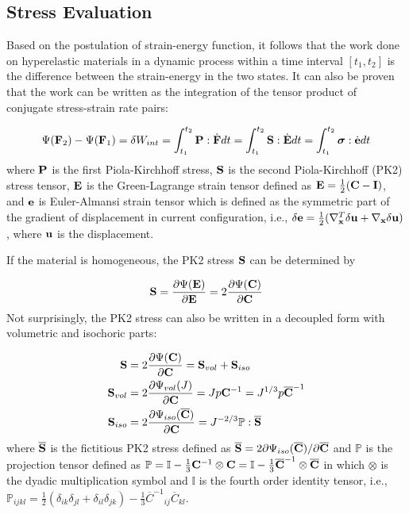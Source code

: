 %
\subsection{Stress Evaluation} \label{general_stress}
Based on the postulation of strain-energy function, it follows that the work done on hyperelastic materials in a dynamic process within a time interval $[t_1, t_2]$ is the difference between the strain-energy in the two states. It can also be proven that the work can be written as the integration of the tensor product of conjugate stress-strain rate pairs:

\begin{equation}
\Psi(\bold{F}_2) - \Psi(\bold{F}_1) = \delta{W_{int}} = \int_{t_1}^{t_2}\bold{P}:\dot{\bold{F}}dt = \int_{t_1}^{t_2}\bold{S}:\dot{\bold{E}}dt = 
\int_{t_1}^{t_2}\boldsymbol{\sigma}:\dot{\bold{e}}dt
\end{equation}
where $\bold{P}$ is the first Piola-Kirchhoff stress, $\bold{S}$ is the second Piola-Kirchhoff (PK2) stress tensor, $\bold{E}$ is the Green-Lagrange strain tensor defined as $\bold{E} = \frac{1}{2}(\bold{C} - \bold{I})$, and $\bold{e}$ is Euler-Almansi strain tensor which is defined as the symmetric part of the gradient of displacement in current configuration, i.e., $\delta\bold{e} = \frac{1}{2}( \nabla_{\bold{x}}^T\delta\bold{u} + \nabla_{\bold{x}}\delta\bold{u} )$, where $\bold{u}$ is the displacement.

If the material is homogeneous, the PK2 stress $\bold{S}$ can be determined by 

\begin{equation}
\bold{S}  = \frac{\partial\Psi(\bold{E})}{\partial{\bold{E}}} = 2\frac{\partial\Psi(\bold{C})}{\partial{\bold{C}}}\end{equation}
Not surprisingly, the PK2 stress can also be written in a decoupled form with volumetric and isochoric parts:

\begin{subequations}
\label{S}
\begin{align}
\bold{S} &=  2\frac{\partial{\Psi({\bold{C})}}}{\partial{\bold{C}}} = \bold{S}_{vol}  + \bold{S}_{iso} 
\label {Stotal} \\
\bold{S}_{vol} &= 2\frac{\partial{\Psi_{vol}(J)}}{\partial{\bold{C}}} = Jp{\bold{C}} ^{-1} \label{Svol} = J^{1/3}p{\overline{\bold{C}}}^{-1}\\
\bold{S}_{iso}  &= 2\frac{\partial{\Psi_{iso}({\overline{\bold{C}})}}}{\partial{\bold{C}}} = J^{-2/3}\mathbb{P}:\overline{\bold{S}}
\label{Siso}
\end{align}
\end{subequations}
where  $\overline{\bold{S}}$ is the fictitious PK2 stress defined as
$\overline{\bold{S}} = 2{\partial\Psi_{iso}({\overline{\bold{C}})}} / {\partial\overline{\bold{C}}}$
and $\mathbb{P}$ is the projection tensor defined as $\mathbb{P} = \mathbb{I} - \frac{1}{3}\bold{C}^{-1} \otimes \bold{C} = \mathbb{I} - \frac{1}{3}\overline{\bold{C}}^{-1} \otimes \overline{\bold{C}} $ in which $\otimes$ is the dyadic multiplication symbol and $\mathbb{I}$ is the fourth order identity tensor, i.e.,  $\mathbb{P}_{ijkl} =  \frac{1}{2}(\delta_{ik}\delta_{jl} + \delta_{il}\delta_{jk}) - \frac{1}{3} {\overline{{C}}^{-1}}_{ij} {\overline{C}}_{kl}$.

